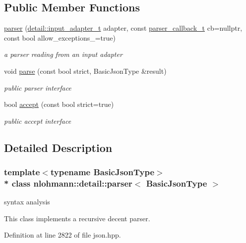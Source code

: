 \subsection*{Public Member Functions}
\begin{DoxyCompactItemize}
\item 
\hyperlink{classnlohmann_1_1detail_1_1parser_a693aa2a6c0cc665e0e45bacf055460e6}{parser} (\hyperlink{namespacenlohmann_1_1detail_ae132f8cd5bb24c5e9b40ad0eafedf1c2}{detail\+::input\+\_\+adapter\+\_\+t} adapter, const \hyperlink{classnlohmann_1_1detail_1_1parser_ad250ad4f2b4af4a497e727c963162ff1}{parser\+\_\+callback\+\_\+t} cb=nullptr, const bool allow\+\_\+exceptions\+\_\+=true)
\begin{DoxyCompactList}\small\item\em a parser reading from an input adapter \end{DoxyCompactList}\item 
void \hyperlink{classnlohmann_1_1detail_1_1parser_a14338d8f3174601c0b2b7ef28752ab17}{parse} (const bool strict, Basic\+Json\+Type \&result)
\begin{DoxyCompactList}\small\item\em public parser interface \end{DoxyCompactList}\item 
bool \hyperlink{classnlohmann_1_1detail_1_1parser_a20997b42262856935b60fc91bf05bf3f}{accept} (const bool strict=true)
\begin{DoxyCompactList}\small\item\em public accept interface \end{DoxyCompactList}\end{DoxyCompactItemize}


\subsection{Detailed Description}
\subsubsection*{template$<$typename Basic\+Json\+Type$>$\\*
class nlohmann\+::detail\+::parser$<$ Basic\+Json\+Type $>$}

syntax analysis 

This class implements a recursive decent parser. 

Definition at line 2822 of file json.\+hpp.



